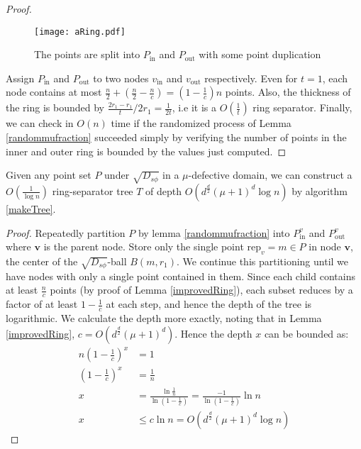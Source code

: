 \documentclass[11pt]{myclass}
\newcommand{\sbreg}{\ensuremath{D_{s\phi}}}
\begin{document}
\begin{proof}
\begin{figure}[H]
  \begin{center}
    \texttt{[image: aRing.pdf]}
  \end{center}
  \caption{The points are split into $P_{\text{in}}$ and $P_{\text{out}}$ with some point duplication}
  \label{aRing}
\end{figure}

Assign $P_{\text{in}}$ and $P_{\text{out}}$ to two nodes $v_{\text{in}}$ and $v_{\text{out}}$ respectively.  Even for $t = 1$,  each node contains at most 
$\frac{n}{2} + (\frac{n}{2} - \frac{n}{c}) = (1 - \frac{1}{c})n$ points. Also, the thickness of the ring is bounded by $\frac{2 r_1 - r_1}{t}/2r_1 = \frac{1}{2t}$, i.e it 
is a $O(\frac{1}{t})$ ring separator.
Finally, we can check in $O(n)$ time if the 
randomized process of Lemma \ref{randommufraction} succeeded simply by verifying the number of points
in the inner and outer ring is bounded by the values just computed.
\end{proof}


\begin{lemma}\label{ringsep}
Given any point set $P$ under $\sqrt{\sbreg}$ in a $\mu$-defective domain, we can construct a $O(\frac{1}{\log n})$ ring-separator tree $T$ of depth $O(d^{\frac{d}{2}} (\mu+1)^d \log n)$ by algorithm \ref{makeTree}.
\end{lemma}

\begin{proof}
Repeatedly partition $P$ by lemma \ref{randommufraction} into $P^{v}_{\text{in}}$ and $P^{v}_{\text{out}}$ where $\textbf{v}$ is the parent node. Store only the single point $\text{rep}_v = m \in P$ in node $\textbf{v}$, the center of the $\sqrt{\sbreg}$-ball $B(m,r_1)$. 
We continue this partitioning until we have nodes with only a single point contained in them.
Since each child contains at least $\frac{n}{c}$ points (by proof of Lemma \ref{improvedRing}), each subset reduces by a factor of at least $1 - \frac{1}{c}$ at each step, 
and hence the depth of the tree is logarithmic. We calculate the depth more exactly, 
noting that in Lemma \ref{improvedRing}, $c = O(d^{\frac{d}{2}} (\mu+1)^d)$.
Hence the depth $x$ can be bounded as:
\begin{align*}
n (1 - \frac{1}{c})^x &= 1 
\\ (1- \frac{1}{c})^x &= \frac{1}{n} 
\\ x &
= \frac{ \ln \frac{1}{n}}{\ln (1 - \frac{1}{c})} 
= \frac{-1}{\ln (1 - \frac{1}{c})} \ln n
\\ x &\leq c \ln n 
 = O \left( d^{\frac{d}{2}} (\mu+1)^d \log n \right)
\end{align*}
\end{proof}
\end{document}
